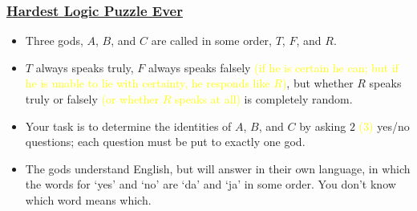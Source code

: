 \documentclass[UTF8,aspectratio=43,11pt,colorlinks,compress,openany]{beamer}%
\begin{document}
\begin{frame}\frametitle{\href{https://mp.weixin.qq.com/s/CEtNyU3OMChVg5vMX5fnLA}{Hardest Logic Puzzle Ever}}
	\begin{problem}
		\begin{itemize}
			\item Three gods, $A$, $B$, and $C$ are called in some order, $T$, $F$, and $R$.
			\item $T$ always speaks truly, $F$ always speaks falsely \textcolor{yellow}{(if he is certain he can; but if he is unable to lie with certainty, he responds like $R$)}, but whether $R$ speaks truly or falsely \textcolor{yellow}{(or whether $R$ speaks at all)} is completely random.
			\item Your task is to determine the identities of $A$, $B$, and $C$ by asking $2$ \textcolor{yellow}{($3$)} yes/no questions; each question must be put to exactly one god.
			\item The gods understand English, but will answer in their own language, in which the words for `yes' and `no' are `da' and `ja' in some order. You don't know which word means which.
		\end{itemize}
	\end{problem}
\end{frame}
\end{document}
